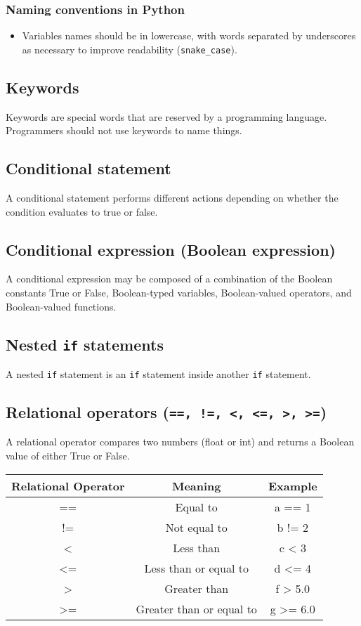 \documentclass[11pt]{article}
\begin{document}
\subsubsection{Naming conventions in Python}
\label{sec:orgc20bfaa}
\begin{itemize}
\item Variables names should be in lowercase, with words separated by underscores as necessary to improve readability (\texttt{snake\_case}).
\end{itemize}

\subsection{Keywords}
\label{sec:orge60bf80}
Keywords are special words that are reserved by a programming language. Programmers should not use keywords to name things.

\subsection{Conditional statement}
\label{sec:orgb776c67}
A conditional statement performs different actions depending on whether the condition evaluates to true or false.

\subsection{Conditional expression (Boolean expression)}
\label{sec:org4d05404}
A conditional expression may be composed of a combination of the Boolean constants True or False, Boolean-typed variables, Boolean-valued operators, and Boolean-valued functions.

\subsection{Nested \texttt{if} statements}
\label{sec:orgac317b6}
A nested \texttt{if} statement is an \texttt{if} statement inside another \texttt{if} statement.

\subsection{Relational operators (\texttt{==, !=, <, <=, >, >=})}
\label{sec:orgb171448}
A relational operator compares two numbers (float or int) and returns a Boolean value of either True or False.

\begin{center}
\begin{tabular}{c|c|c}
Relational Operator & Meaning & Example\\[0pt]
\hline
== & Equal to & a == 1\\[0pt]
!= & Not equal to & b != 2\\[0pt]
< & Less than & c < 3\\[0pt]
<= & Less than or equal to & d <= 4\\[0pt]
> & Greater than & f > 5.0\\[0pt]
>= & Greater than or equal to & g >= 6.0\\[0pt]
\end{tabular}
\end{center}
\end{document}
